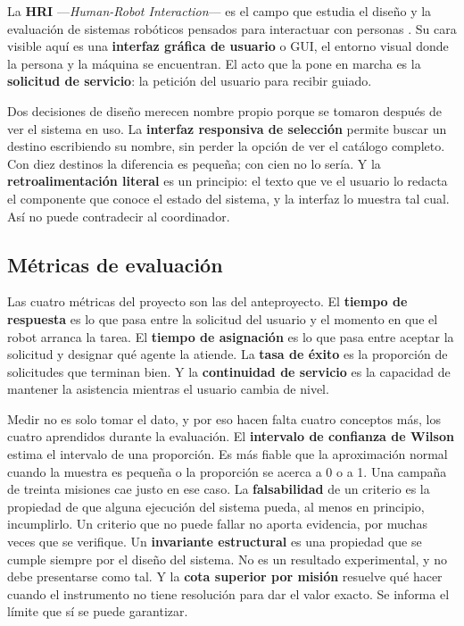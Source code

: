 La \textbf{HRI} —\textit{Human-Robot Interaction}— es el campo que estudia el
diseño y la evaluación de sistemas robóticos pensados para interactuar con
personas \autocite{jimenez2024arquitectura}. Su cara visible aquí es una
\textbf{interfaz gráfica de usuario} o GUI, el entorno visual donde la persona y
la máquina se encuentran. El acto que la pone en marcha es la \textbf{solicitud
de servicio}: la petición del usuario para recibir guiado.

Dos decisiones de diseño merecen nombre propio porque se tomaron después de ver
el sistema en uso. La \textbf{interfaz responsiva de selección} permite buscar un
destino escribiendo su nombre, sin perder la opción de ver el catálogo completo.
Con diez destinos la diferencia es pequeña; con cien no lo sería. Y la
\textbf{retroalimentación literal} es un principio: el texto que ve el usuario lo
redacta el componente que conoce el estado del sistema, y la interfaz lo muestra
tal cual. Así no puede contradecir al coordinador.

\subsection{Métricas de evaluación}

Las cuatro métricas del proyecto son las del anteproyecto. El \textbf{tiempo de
respuesta} es lo que pasa entre la solicitud del usuario y el momento en que el
robot arranca la tarea. El \textbf{tiempo de asignación} es lo que pasa entre
aceptar la solicitud y designar qué agente la atiende. La \textbf{tasa de éxito}
es la proporción de solicitudes que terminan bien. Y la \textbf{continuidad de
servicio} es la capacidad de mantener la asistencia mientras el usuario cambia de
nivel.

Medir no es solo tomar el dato, y por eso hacen falta cuatro conceptos más, los
cuatro aprendidos durante la evaluación. El \textbf{intervalo de confianza de
Wilson} estima el intervalo de una proporción. Es más fiable que la aproximación
normal cuando la muestra es pequeña o la proporción se acerca a 0 o a 1. Una
campaña de treinta misiones cae justo en ese caso. La \textbf{falsabilidad} de un
criterio es la propiedad de que alguna ejecución del sistema pueda, al menos en
principio, incumplirlo. Un criterio que no puede fallar no aporta evidencia, por
muchas veces que se verifique. Un \textbf{invariante estructural}
es una propiedad que se cumple siempre por el diseño del sistema. No es un
resultado experimental, y no debe presentarse como tal. Y la \textbf{cota
superior por misión} resuelve qué hacer cuando el instrumento no tiene resolución
para dar el valor exacto. Se informa el límite que sí se puede garantizar.

